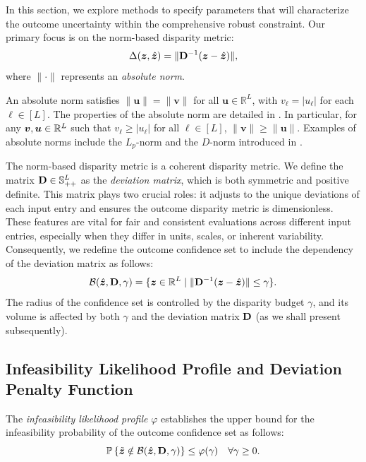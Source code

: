 \documentclass[mnsc, nonblindrev]{informswp}
\newcommand{\1}[1]{\mathds{1}{\left(#1\right)}}
\begin{document}
In this section, we explore methods to specify parameters that will characterize the outcome uncertainty within the comprehensive robust constraint. Our primary focus is on the norm-based disparity metric:
$$
\Delta(\bm z,\hat{\bm{z}}) = \| {\mathbf{D}}^{-1} (\bm z - \hat{\bm{z}}) \|,
$$
where $\|\cdot\|$ represents an {\em absolute norm}. 

\begin{definition}
\textnormal{
An absolute norm satisfies $\|\bm u\| = \| \bm v\|$ for all $\bm u \in \mathbb{R}^L$, with $v_\ell = |u_\ell|$ for each $\ell \in [L]$. The properties of the absolute norm are detailed in \cite{bertsimas2006tractable}. In particular, for any $\bm v, \bm u \in \mathbb{R}^L$ such that $v_\ell\geq |u_\ell|$ for all $\ell \in [L]$, $\|\bm v\|\geq \|\bm u\|$. Examples of absolute norms include the $L_p$-norm and the $D$-norm introduced in \cite{bertsimas2004robust}.
}
\end{definition}

The norm-based disparity metric is a coherent disparity metric.
We define the matrix ${\mathbf{D}} \in \mathbb{S}^L_{++}$ as the {\em deviation matrix}, which is both symmetric and positive definite. This matrix plays two crucial roles: it adjusts to the unique deviations of each input entry and ensures the outcome disparity metric is dimensionless. These features are vital for fair and consistent evaluations across different input entries, especially when they differ in units, scales, or inherent variability. Consequently, we redefine the outcome confidence set to include the dependency of the deviation matrix as follows:
$$
\mathcal{B}(\hat{\bm{z}}, {\mathbf{D}}, \gamma) = \{ \bm z \in \mathbb{R}^L \;|\; \| {\mathbf{D}}^{-1} (\bm z - \hat{\bm{z}}) \| \leq \gamma \}.
$$
The radius of the confidence set is controlled by the disparity budget $\gamma$, and its volume is affected by both $\gamma$ and the deviation matrix ${\mathbf{D}}$ (as we shall present subsequently).

\subsection{Infeasibility Likelihood Profile and Deviation Penalty Function}

The \textit{infeasibility likelihood  profile} $\varphi$ establishes the upper bound for the infeasibility probability of the outcome confidence set as follows:
$$
\mathbb{P}\left\{\tilde{\bm{z}} \notin \mathcal{B}(\hat{\bm{z}},{\mathbf{D}}, \gamma)\right\} \leq \varphi(\gamma) ~~~\forall \gamma \geq 0.
$$
\end{document}
